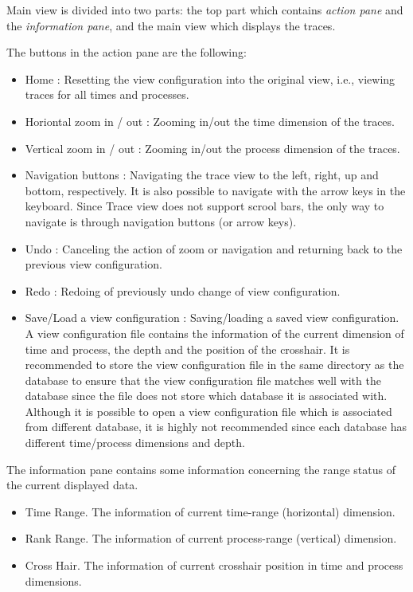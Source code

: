 \documentclass[english]{article}
\begin{document}
Main view is divided into two parts: the top part which contains \emph{action pane} and the \emph{information pane}, and the main view which displays the traces.

The buttons in the action pane are the following:
\begin{itemize}

\item Home : Resetting the view configuration into the original view, i.e., viewing traces for all times and processes.
\item Horiontal zoom in / out : Zooming in/out the time dimension of the traces.
\item Vertical zoom in / out : Zooming in/out the process dimension of the traces.
\item Navigation buttons : Navigating the trace view to the left, right, up and bottom, respectively. It is also possible to navigate with the arrow keys in the keyboard. Since Trace view does not support scrool bars, the only way to navigate is through navigation buttons (or arrow keys).
\item Undo : Canceling the action of zoom or navigation and returning back to the previous view configuration.
\item Redo : Redoing of previously undo change of view configuration.
\item Save/Load a view configuration : Saving/loading a saved view configuration.
A view configuration file contains the information of the current dimension of time and process, the depth and the position of the crosshair.
It is recommended to store the view configuration file in the same directory as the database to ensure that the view configuration file matches well with the database since the file does not store which database it is associated with.
Although it is possible to open a view configuration file which is associated from different database, it is highly not recommended since each database has different time/process dimensions and depth.


\end{itemize}

The information pane contains some information concerning the range status of the current displayed data.
\begin{itemize}
 \item Time Range. The information of current time-range (horizontal) dimension.
 \item Rank Range. The information of current process-range (vertical) dimension.
 \item Cross Hair. The information of current crosshair position in time and process dimensions.
\end{itemize}
\end{document}

